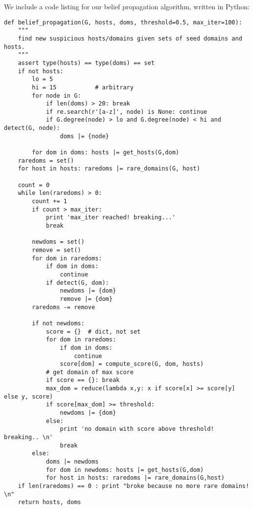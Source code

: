 \documentclass{article} %
\begin{document}
We include a code listing for our belief propagation algorithm, written in Python:
\begin{lstlisting}
def belief_propagation(G, hosts, doms, threshold=0.5, max_iter=100):
	"""
	find new suspicious hosts/domains given sets of seed domains and hosts.
	"""
	assert type(hosts) == type(doms) == set
	if not hosts:
		lo = 5
		hi = 15           # arbitrary
		for node in G:
			if len(doms) > 20: break
			if re.search(r'[a-z]', node) is None: continue
			if G.degree(node) > lo and G.degree(node) < hi and detect(G, node):
				doms |= {node}
	
		for dom in doms: hosts |= get_hosts(G,dom)
	raredoms = set()
	for host in hosts: raredoms |= rare_domains(G, host)
	
	count = 0
	while len(raredoms) > 0:
		count += 1
		if count > max_iter:
			print 'max_iter reached! breaking...'
			break
		
		newdoms = set()
		remove = set()
		for dom in raredoms:
			if dom in doms:
				continue
			if detect(G, dom):
				newdoms |= {dom}
				remove |= {dom}
		raredoms -= remove
		
		if not newdoms:
			score = {}  # dict, not set
			for dom in raredoms:
				if dom in doms:
					continue
				score[dom] = compute_score(G, dom, hosts)
			# get domain of max score
			if score == {}: break
			max_dom = reduce(lambda x,y: x if score[x] >= score[y] else y, score)
			if score[max_dom] >= threshold:
				newdoms |= {dom}
			else:
				print 'no domain with score above threshold! breaking.. \n'
				break
		else:
			doms |= newdoms
			for dom in newdoms: hosts |= get_hosts(G,dom)
			for host in hosts: raredoms |= rare_domains(G,host)
	if len(raredoms) == 0 : print "broke because no more rare domains! \n"
	return hosts, doms
\end{lstlisting}
\end{document}
